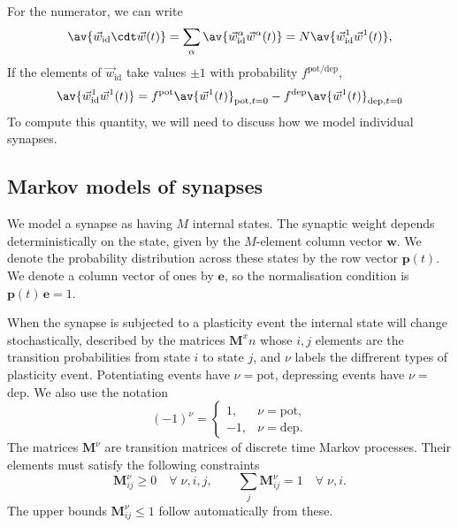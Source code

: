 \documentclass[12pt]{article}
\newcommand{\onev}{\mathbf{e}}
\newcommand{\pr}{\mathbf{p}}
\newcommand{\w}{\mathbf{w}}
\newcommand{\M}{\mathbf{M}}
\newcommand{\pot}{^{\text{pot}}}
\newcommand{\dep}{^{\text{dep}}}
\newcommand{\potdep}{^{\text{pot/dep}}}
\newcommand{\syn}{\vec{w}}
\newcommand{\synid}{\syn_\text{id}}
\begin{document}
For the numerator, we can write
%
\begin{equation}\label{eq:overlapex}
  \av{\synid\cdt\syn(t)} = \sum_\alpha\av{\synid^\alpha\syn^\alpha(t)}
   = N \av{\synid^1\syn^1(t)},
\end{equation}
%
If the elements of $\synid$ take values $\pm1$ with probability $f\potdep$,
%
\begin{equation}\label{eq:overlapone}
  \av{\synid^1\syn^1(t)} = f\pot \av{\syn^1(t)}_{\text{pot},t=0} - f\dep \av{\syn^1(t)}_{\text{dep},t=0}
\end{equation}
%
To compute this quantity, we will need to discuss how we model individual synapses.




\subsection{Markov models of synapses}\label{sec:markovsynapse}

We model a synapse as having $M$ internal states.
The synaptic weight depends deterministically on the state, given by the $M$-element column vector $\w$.
We denote the probability distribution across these states by the row vector $\pr(t)$.
We denote a column vector of ones by $\onev$, so the normalisation condition is $\pr(t) \, \onev=1$.

When the synapse is subjected to a plasticity event the internal state will change stochastically, described by the matrices $\M^xn  $ whose $i,j$ elements are the transition probabilities from state $i$ to state $j$, 
and \(\nu \) labels the diffrerent types of plasticity event.
Potentiating events have \(\nu=\)pot, depressing events have \(\nu=\)dep.
We also use the notation
%
\begin{equation*}
  (-1)^\nu = 
    \begin{cases}
       1, & \nu = \text{pot}, \\
      -1, & \nu = \text{dep}.
    \end{cases}
\end{equation*}
%
The matrices $\M^\nu$ are transition matrices of discrete time Markov processes.
Their elements must satisfy the following constraints
%
\begin{equation}\label{eq:constr}
  \M^\nu_{ij} \geq 0 
    \quad \forall \; \nu, i, j, \qquad
  \sum_j \M^\nu_{ij} = 1
    \quad \forall \; \nu, i.
\end{equation}
%
The upper bounds $\M^\nu_{ij} \leq 1$ follow automatically from these.
\end{document}
